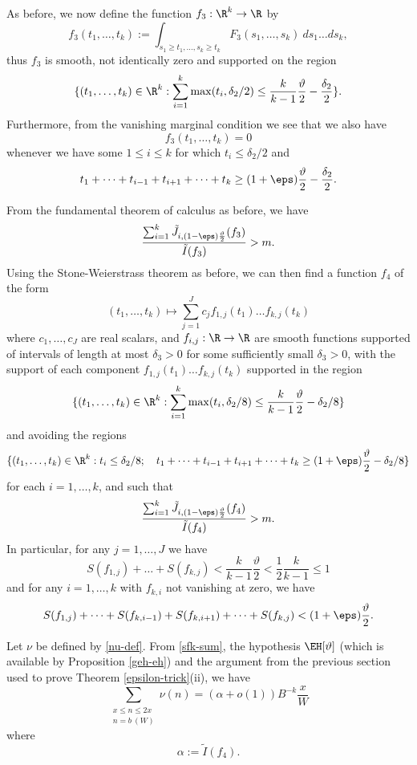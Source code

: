As before, we now define the function $f_3: \R^k \to \R$ by
$$ f_3(t_1,\dots,t_k) := \int_{s_1 \geq t_1, \dots, s_k \geq t_k} F_3(s_1,\dots,s_k)\ ds_1 \dots ds_k,$$
thus $f_3$ is smooth, not identically zero and supported on the region
$$ \{ (t_1,\dots,t_k) \in \R^k: \sum_{i=1}^k \max(t_i, \delta_2/2) \leq \frac{k}{k-1} \frac{\vartheta}{2} - \frac{\delta_2}{2} \}.$$
Furthermore, from the vanishing marginal condition we see that we also have
$$ f_3(t_1,\dots,t_k) =0 $$
whenever we have some $1 \leq i \leq k$ for which $t_i \leq \delta_2/2$ and
$$ t_1 + \dots + t_{i-1} + t_{i+1} + \dots + t_k \geq (1+\eps) \frac{\vartheta}{2} - \frac{\delta_2}{2}.$$

From the fundamental theorem of calculus as before, we have
$$
\frac{\sum_{i=1}^k \tilde J_{i,(1-\eps) \frac{\vartheta}{2}}(f_3)}{\tilde I(f_3)} > m.
$$
Using the Stone-Weierstrass theorem as before, we can then find a function $f_4$ of the form
\begin{equation}\label{cff-again}
 (t_1,\dots,t_k) \mapsto \sum_{j=1}^J c_j f_{1,j}(t_1) \dots f_{k,j}(t_k)
\end{equation}
where $c_1,\dots,c_J$ are real scalars, and $f_{i,j}: \R \to \R$ are smooth functions supported of intervals of length at most $\delta_3>0$ for some sufficiently small $\delta_3>0$, with the support of each component
$f_{1,j}(t_1) \dots f_{k,j}(t_k)$ supported in the region
$$ \{ (t_1,\dots,t_k) \in \R^k: \sum_{i=1}^k \max(t_i, \delta_2/8) \leq \frac{k}{k-1} \frac{\vartheta}{2} - \delta_2/8 \}$$
and avoiding the regions
$$ \{ (t_1,\dots,t_k) \in \R^k: t_i \leq \delta_2/8; \quad  t_1 + \dots + t_{i-1} + t_{i+1} + \dots + t_k \geq (1+\eps) \frac{\vartheta}{2} - \delta_2/8 \}$$
for each $i=1,\dots,k$, and such that
$$
\frac{\sum_{i=1}^k \tilde J_{i,(1-\eps) \frac{\vartheta}{2}}(f_4)}{\tilde I(f_4)} > m.
$$
In particular, for any $j=1,\dots,J$ we have
\begin{equation}\label{sfk-sum}
S(f_{1,j}) + \dots + S(f_{k,j}) < \frac{k}{k-1} \frac{\vartheta}{2} < \frac{1}{2} \frac{k}{k-1} \leq 1
\end{equation}
and for any $i=1,\dots,k$ with $f_{k,i}$ not vanishing at zero, we have
\begin{equation}\label{sfk-sum-2} 
S(f_{1,j}) + \dots + S(f_{k,i-1}) + S(f_{k,i+1}) + \dots + S(f_{k,j}) < (1+\eps) \frac{\vartheta}{2}.
\end{equation}

Let $\nu$ be defined by \eqref{nu-def}.
From \eqref{sfk-sum}, the hypothesis $\EH[\vartheta]$ (which is available by Proposition \ref{geh-eh}) and the argument from the previous section used to prove Theorem \ref{epsilon-trick}(ii), we have
$$ \sum_{\substack{x \leq n \leq 2x\\ n = b\ (W)}} \nu(n) = (\alpha + o(1)) B^{-k} \frac{x}{W}$$
where 
$$ \alpha := \tilde I(f_4).$$

